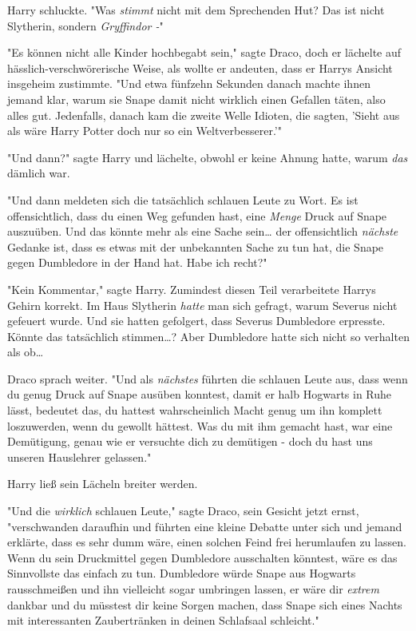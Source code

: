 {Harry schluckte. "Was \emph{stimmt} nicht mit dem Sprechenden Hut? Das ist nicht Slytherin, sondern \emph{Gryffindor -}"

"Es können nicht alle Kinder hochbegabt sein," sagte Draco, doch er lächelte auf hässlich-verschwörerische Weise, als wollte er andeuten, dass er Harrys Ansicht insgeheim zustimmte. "Und etwa fünfzehn Sekunden danach machte ihnen jemand klar, warum sie Snape damit nicht wirklich einen Gefallen täten, also alles gut. Jedenfalls, danach kam die zweite Welle Idioten, die sagten, 'Sieht aus als wäre Harry Potter doch nur so ein Weltverbesserer.'"

"Und dann?" sagte Harry und lächelte, obwohl er keine Ahnung hatte, warum \emph{das} dämlich war.

"Und dann meldeten sich die tatsächlich schlauen Leute zu Wort. Es ist offensichtlich, dass du einen Weg gefunden hast, eine \emph{Menge} Druck auf Snape auszuüben. Und das könnte mehr als eine Sache sein… der offensichtlich \emph{nächste} Gedanke ist, dass es etwas mit der unbekannten Sache zu tun hat, die Snape gegen Dumbledore in der Hand hat. Habe ich recht?"

"Kein Kommentar," sagte Harry. Zumindest diesen Teil verarbeitete Harrys Gehirn korrekt. Im Haus Slytherin \emph{hatte} man sich gefragt, warum Severus nicht gefeuert wurde. Und sie hatten gefolgert, dass Severus Dumbledore erpresste. Könnte das tatsächlich stimmen…? Aber Dumbledore hatte sich nicht so verhalten als ob…

Draco sprach weiter. "Und als \emph{nächstes} führten die schlauen Leute aus, dass wenn du genug Druck auf Snape ausüben konntest, damit er halb Hogwarts in Ruhe lässt, bedeutet das, du hattest wahrscheinlich Macht genug um ihn komplett loszuwerden, wenn du gewollt hättest. Was du mit ihm gemacht hast, war eine Demütigung, genau wie er versuchte dich zu demütigen - doch du hast uns unseren Hauslehrer gelassen."

Harry ließ sein Lächeln breiter werden.

"Und die \emph{wirklich} schlauen Leute," sagte Draco, sein Gesicht jetzt ernst, "verschwanden daraufhin und führten eine kleine Debatte unter sich und jemand erklärte, dass es sehr dumm wäre, einen solchen Feind frei herumlaufen zu lassen. Wenn du sein Druckmittel gegen Dumbledore ausschalten könntest, wäre es das Sinnvollste das einfach zu tun. Dumbledore würde Snape aus Hogwarts rausschmeißen und ihn vielleicht sogar umbringen lassen, er wäre dir \emph{extrem} dankbar und du müsstest dir keine Sorgen machen, dass Snape sich eines Nachts mit interessanten Zaubertränken in deinen Schlafsaal schleicht."

}
